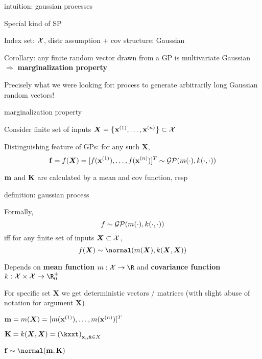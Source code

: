 \documentclass[11pt,compress,t,notes=noshow, xcolor=table]{beamer}
\begin{document}

\begin{framei}[sep=L]{intuition: gaussian processes}
\item Special kind of SP 
\item Index set: $\Xspace$, distr assumption + cov structure: Gaussian 
\item Corollary: any finite random vector drawn from a GP is multivariate Gaussian $\Rightarrow$ \textbf{marginalization property}
\vfill
{}
\vfill
\item Precisely what we were looking for: process to generate arbitrarily long Gaussian random vectors!
\end{framei}

\begin{framei}[sep=L]{marginalization property}
\item Consider finite set of inputs $\bm{X} = \xdat \subset \Xspace$
\item Distinguishing feature of GPs: for any such $\bm{X}$,
    $$
      \fv = f(\bm{X}) = \fvec^T \sim \GPmk
    $$ 
\item $\mv$ and $\Kmat$ are calculated by a mean and cov function, resp
\vfill
{}
\end{framei}

\begin{framei}[sep=L]{definition: gaussian process}
\item Formally, 
$$f \sim \GPmk$$
iff for any finite set of inputs $\bm{X} \subset \Xspace$, 
$$
f(\bm{X}) \sim \normal(\mX, \kXX)
$$
\item Depends on \textbf{mean function} $m: \Xspace \rightarrow \R$ and \textbf{covariance function} $k: \Xspace \times \Xspace \rightarrow \R^+_0$
\item For specific set $\bm{X}$ we get deterministic vectors / matrices (with slight abuse of notation for argument $\bm{X}$)
\vfill
\begin{itemizeM}
\item $\mv = m(\bm{X}) = [m(\xi[1]), \dots, m(\xi[n])]^T$
\item $\Kmat = k(\bm{X}, \bm{X}) = \left(\kxxt \right)_{\xv, , \xtil \in X}$
\item $\fv \sim \normal(\mv, \Kmat)$
\end{itemizeM}
\end{framei}
\end{document}
